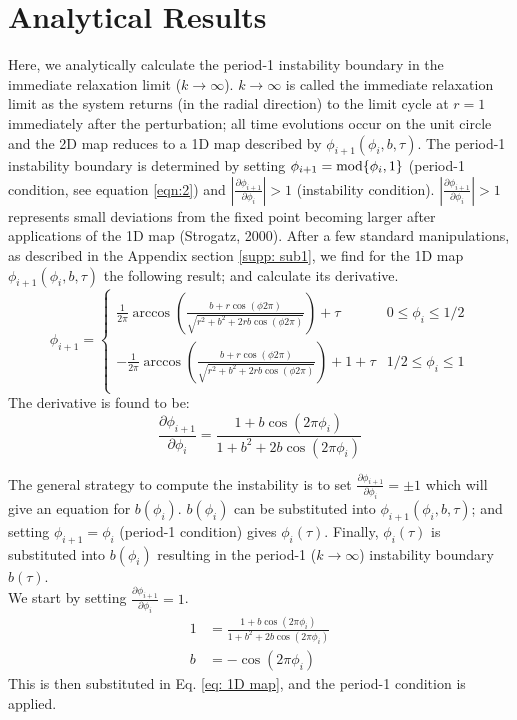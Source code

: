 \section{Analytical Results}
\indent Here, we analytically calculate the period-1 instability boundary in the immediate relaxation limit ($k \rightarrow \infty$). $k \rightarrow \infty$ is called the immediate relaxation limit as the system returns (in the radial direction) to the limit cycle at $r=1$ immediately after the perturbation; all time evolutions occur on the unit circle and the 2D map reduces to a 1D map described by $\phi_{i+1}(\phi_i, b, \tau)$. The period-1 instability boundary is determined by setting $\phi_{i+1} = \textnormal{mod} \{\phi_i,1\}$ (period-1 condition, see equation \ref{eqn:2}) and $|\frac{\partial \phi_{i+1}}{\partial \phi_i}|>1$ (instability condition). $|\frac{\partial \phi_{i+1}}{\partial \phi_i}|>1$ represents small deviations from the fixed point becoming larger after applications of the 1D map (Strogatz, 2000\supercite{Strogatz}). After a few standard manipulations, as described in the Appendix section \ref{supp: sub1}, we find for the 1D map $\phi_{i+1}(\phi_i, b, \tau)$ the following result; and calculate its derivative.
\begin{equation}
    \phi_{i+1} =
    \begin{cases}
     \frac{1}{2\pi}\arccos(\frac{b+r \cos(\phi 2\pi)}{\sqrt{r^2+b^2+2rb\cos(\phi 2\pi)}}) + \tau & 0 \leq \phi_i \leq 1/2 \\
    -\frac{1}{2\pi}\arccos(\frac{b+r \cos(\phi 2\pi)}{\sqrt{r^2+b^2+2rb\cos(\phi 2\pi)}}) + 1 +\tau & 1/2 \leq \phi_i \leq 1 \\
    \end{cases}
    \label{eq: 1D map}
\end{equation} The derivative is found to be:
\begin{equation}
    \frac{\partial \phi_{i+1}}{\partial \phi_i} = \frac{1+b\cos(2\pi \phi_i)}{1 + b^2 + 2b\cos(2\pi \phi_i)}
\end{equation}

\indent The general strategy to compute the instability is to set $\frac{\partial \phi_{i+1}}{\partial \phi_i} = \pm 1$ which will give an equation for $b(\phi_i)$. $b(\phi_i)$ can be substituted into $\phi_{i+1}(\phi_i,b,\tau)$; and setting $\phi_{i+1} = \phi_i$ (period-1 condition) gives $\phi_i(\tau)$. Finally, $\phi_i(\tau)$ is substituted into $b(\phi_i)$ resulting in the period-1 ($k\rightarrow \infty$) instability boundary $b(\tau)$.\\
We start by setting $\frac{\partial \phi_{i+1}}{\partial \phi_i} = 1$.
\begin{align}
    1 &= \frac{1+b\cos(2\pi \phi_i)}{1 + b^2 + 2b\cos(2\pi \phi_i)} \\
    b&= -\cos(2\pi \phi_i) \label{eq: bcos}
\end{align} This is then substituted in Eq. \ref{eq: 1D map}, and the period-1 condition is applied. 

